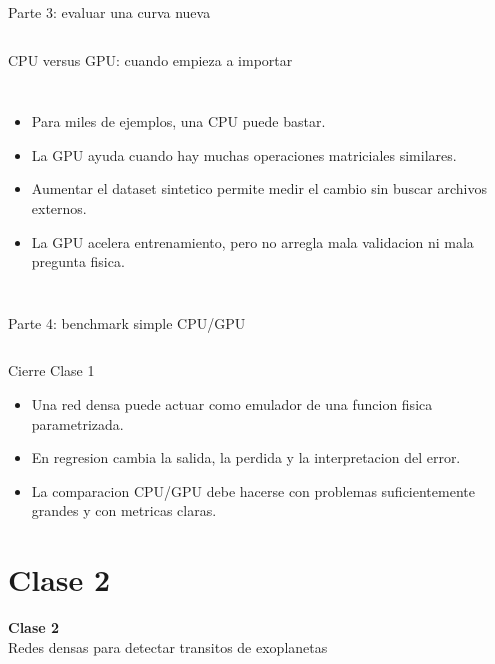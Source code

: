 \begin{frame}[fragile]{Parte 3: evaluar una curva nueva}
\inputminted{python}{codes/clase1-p3.py}
\end{frame}

\begin{frame}{CPU versus GPU: cuando empieza a importar}
\begin{columns}[T,onlytextwidth]
\begin{itemize}
    \item Para miles de ejemplos, una CPU puede bastar.
    \item La GPU ayuda cuando hay muchas operaciones matriciales similares.
    \item Aumentar el dataset sintetico permite medir el cambio sin buscar archivos externos.
    \item La GPU acelera entrenamiento, pero no arregla mala validacion ni mala pregunta fisica.
\end{itemize}
\centering
\resizebox{0.96\linewidth}{!}{}
\end{columns}
\end{frame}

\begin{frame}[fragile]{Parte 4: benchmark simple CPU/GPU}
\inputminted{python}{codes/clase1-p4.py}
\end{frame}

\begin{frame}{Cierre Clase 1}
\begin{itemize}
    \item Una red densa puede actuar como emulador de una funcion fisica parametrizada.
    \item En regresion cambia la salida, la perdida y la interpretacion del error.
    \item La comparacion CPU/GPU debe hacerse con problemas suficientemente grandes y con metricas claras.
\end{itemize}
\end{frame}

\section{Clase 2}

\begin{frame}[plain]
\centering
\vfill
{\Huge \bfseries Clase 2}\\[0.4cm]
{\Large Redes densas para detectar transitos de exoplanetas}
\vfill
\end{frame}

